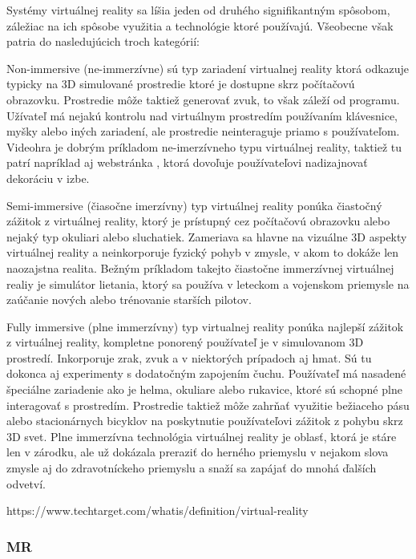 Systémy virtuálnej reality sa líšia jeden od druhého signifikantným spôsobom, záležiac na ich spôsobe využitia a technológie ktoré používajú. Všeobecne však patria do nasledujúcich troch kategórií: 

Non-immersive (ne-immerzívne) sú typ zariadení virtualnej reality ktorá odkazuje typicky na 3D simulované prostredie ktoré je dostupne skrz počítačovú obrazovku. Prostredie môže taktiež generovať zvuk, to však záleží od programu. Užívateľ má nejakú kontrolu nad virtuálnym prostredím používaním klávesnice, myšky alebo iných zariadení, ale prostredie neinteraguje priamo s používateľom. Videohra je dobrým príkladom ne-imerzívneho typu virtuálnej reality, taktiež tu patrí napríklad aj webstránka , ktorá dovoľuje používateľovi nadizajnovať dekoráciu v izbe. 

Semi-immersive (čiasočne imerzívny) typ virtuálnej reality ponúka čiastočný zážitok z virtuálnej reality, ktorý je prístupný cez počítačovú obrazovku alebo nejaký typ okuliari alebo sluchatiek. Zameriava sa hlavne na vizuálne 3D aspekty virtuálnej reality a neinkorporuje fyzický pohyb v zmysle, v akom to dokáže len naozajstna realita. Bežným príkladom takejto čiastočne immerzívnej virtuálnej realiy je simulátor lietania, ktorý sa používa v leteckom a vojenskom priemysle na zaúčanie nových alebo trénovanie starších pilotov. 

Fully immersive (plne immerzívny) typ virtualnej reality ponúka najlepší zážitok z virtuálnej reality, kompletne ponorený používateľ je v simulovanom 3D prostredí. Inkorporuje zrak, zvuk a v niektorých prípadoch aj hmat. Sú tu dokonca aj experimenty s dodatočným zapojením čuchu. Používateľ má nasadené špeciálne zariadenie ako je helma, okuliare alebo rukavice, ktoré sú schopné plne interagovať s prostredím. Prostredie taktiež môže zahrňať využitie bežiaceho pásu alebo stacionárnych bicyklov na poskytnutie používateľovi zážitok z pohybu skrz 3D svet. Plne immerzívna technológia virtuálnej reality je oblasť, ktorá je stáre len v zárodku, ale už dokázala preraziť do herného priemyslu v nejakom slova zmysle aj do zdravotníckeho priemyslu a snaží sa zapájať do mnohá ďalších odvetví. 

https://www.techtarget.com/whatis/definition/virtual-reality

\subsubsection{MR}

